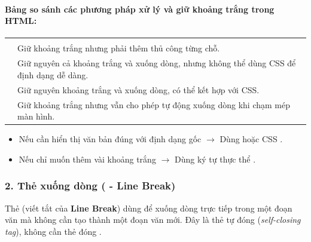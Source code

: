 \paragraph{Bảng so sánh các phương pháp xử lý và giữ khoảng trắng trong HTML:}

\begin{prettyTableBox}
\begin{tabularx}{\linewidth}{>{\bfseries\color{primaryBlue}}C{3.8cm} Z}
 &  \\
 & Giữ khoảng trắng nhưng phải thêm thủ công từng chỗ. \\
 & Giữ nguyên cả khoảng trắng và xuống dòng, nhưng không thể dùng CSS để định dạng dễ dàng. \\
 & Giữ nguyên khoảng trắng và xuống dòng, có thể kết hợp với CSS. \\
 & Giữ khoảng trắng nhưng vẫn cho phép tự động xuống dòng khi chạm mép màn hình. \\
\end{tabularx}
\end{prettyTableBox}

\begin{noteBox}
\begin{itemize}[leftmargin=1.5em, itemsep=2pt, parsep=0pt]
    \item Nếu cần hiển thị văn bản đúng với định dạng gốc $\rightarrow$ Dùng  hoặc CSS .
    \item Nếu chỉ muốn thêm vài khoảng trắng $\rightarrow$ Dùng ký tự thực thể .
\end{itemize}
\end{noteBox}

\subsubsection{2. Thẻ xuống dòng ( - Line Break)}

Thẻ  (viết tắt của \textbf{Line Break}) dùng để xuống dòng trực tiếp trong một đoạn văn mà không cần tạo thành một đoạn văn mới. Đây là thẻ tự đóng (\textit{self-closing tag}), không cần thẻ đóng .

